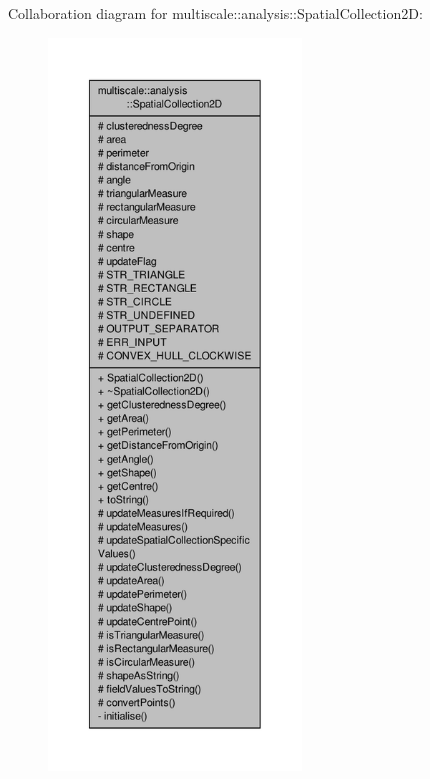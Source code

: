 Collaboration diagram for multiscale\-:\-:analysis\-:\-:Spatial\-Collection2\-D\-:\nopagebreak
\begin{figure}[H]
\begin{center}
\leavevmode
\includegraphics[height=550pt]{classmultiscale_1_1analysis_1_1SpatialCollection2D__coll__graph}
\end{center}
\end{figure}
